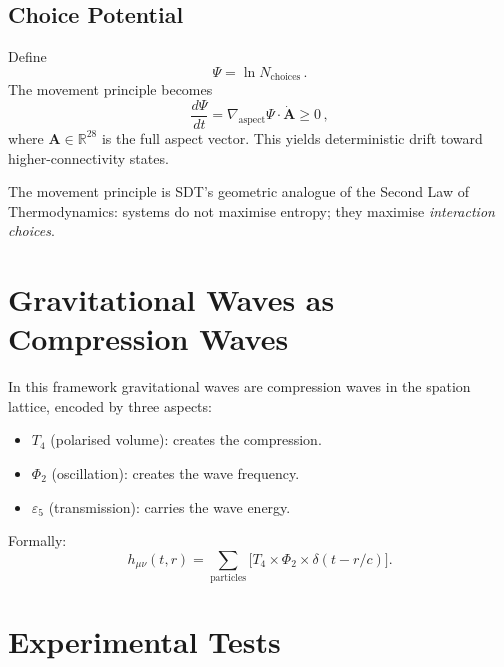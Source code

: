 \subsection{Choice Potential}

Define
\begin{equation}
  \Psi = \ln N_{\text{choices}}\,.
\end{equation}
The movement principle becomes
\begin{equation}
  \frac{d\Psi}{dt}
    = \nabla_{\text{aspect}}\Psi \cdot \dot{\mathbf{A}} \ge 0\,,
\end{equation}
where $\mathbf{A} \in \mathbb{R}^{28}$ is the full aspect vector.  This yields deterministic drift toward higher-connectivity states.

The movement principle is SDT's geometric analogue of the Second Law of Thermodynamics: systems do not maximise entropy; they maximise \emph{interaction choices}.


\section{Gravitational Waves as Compression Waves}

In this framework gravitational waves are compression waves in the spation lattice, encoded by three aspects:

\begin{itemize}
  \item $T_4$ (polarised volume): creates the compression.
  \item $\Phi_2$ (oscillation): creates the wave frequency.
  \item $\varepsilon_5$ (transmission): carries the wave energy.
\end{itemize}

Formally:
\begin{equation}
  h_{\mu\nu}(t, r)
    = \sum_{\text{particles}} \bigl[T_4 \times \Phi_2 \times \delta\!\left(t - r/c\right)\bigr].
\end{equation}


\section{Experimental Tests}

